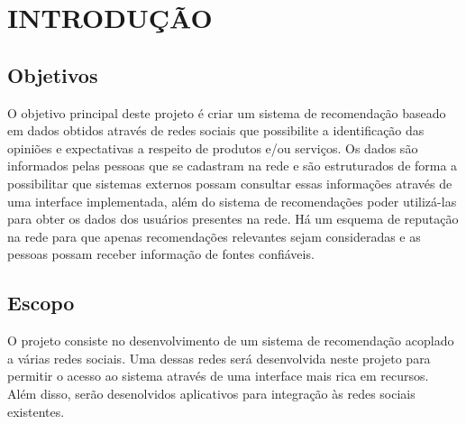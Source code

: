 \chapter{INTRODUÇÃO}

\section{Objetivos}

O objetivo principal deste projeto é criar um sistema de recomendação baseado em dados obtidos através de redes sociais que possibilite a identificação das opiniões e expectativas a respeito de produtos e/ou serviços. Os dados são informados pelas pessoas que se cadastram na rede e são estruturados de forma a possibilitar que sistemas externos possam consultar essas informações através de uma interface implementada, além do sistema de recomendações poder utilizá-las para obter os dados dos usuários presentes na rede. Há um esquema de reputação na rede para que apenas recomendações relevantes sejam consideradas e as pessoas possam receber informação de fontes confiáveis.

\section{Escopo}

O projeto consiste no desenvolvimento de um sistema de recomendação acoplado a várias redes sociais. Uma dessas redes será desenvolvida neste projeto para permitir o acesso ao sistema através de uma interface mais rica em recursos. Além disso, serão desenolvidos aplicativos para integração às redes sociais existentes.

